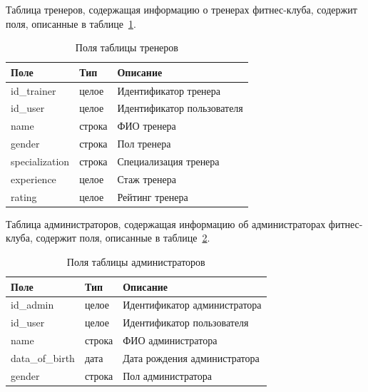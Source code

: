 Таблица тренеров, содержащая информацию о тренерах фитнес-клуба, содержит поля, описанные в таблице~\ref{tbl:pol_trainers}.
\begin{table}[h!]
	\begin{center}
		\begin{threeparttable}
			\captionsetup{justification=raggedright,singlelinecheck=off}
			\caption{\label{tbl:pol_trainers} Поля таблицы тренеров}
			\begin{tabular}{|p{4cm}|p{4cm}|p{6cm}|}
				\hline
				Поле & Тип & Описание \\
				\hline
				id\_trainer & целое & Идентификатор тренера \\
				\hline
				id\_user & целое & Идентификатор пользователя \\
				\hline
				name & строка & ФИО тренера \\
				\hline
				gender & строка & Пол тренера \\
				\hline
				specialization & строка & Специализация тренера \\
				\hline
				experience & целое & Стаж тренера \\
				\hline
				rating & целое & Рейтинг тренера \\
				\hline
			\end{tabular}
		\end{threeparttable}
	\end{center}
\end{table}

Таблица администраторов, содержащая информацию об администраторах фитнес-клуба, содержит поля, описанные в таблице~\ref{tbl:pol_admins}.
\begin{table}[h!]
	\begin{center}
		\begin{threeparttable}
			\captionsetup{justification=raggedright,singlelinecheck=off}
			\caption{\label{tbl:pol_admins} Поля таблицы администраторов}
			\begin{tabular}{|p{4cm}|p{4cm}|p{6cm}|}
				\hline
				Поле & Тип & Описание \\
				\hline
				id\_admin & целое & Идентификатор администратора \\
				\hline
				id\_user & целое & Идентификатор пользователя \\
				\hline
				name & строка & ФИО администратора \\
				\hline
				data\_of\_birth & дата & Дата рождения администратора \\
				\hline
				gender & строка & Пол администратора \\
				\hline
			\end{tabular}
		\end{threeparttable}
	\end{center}
\end{table}

